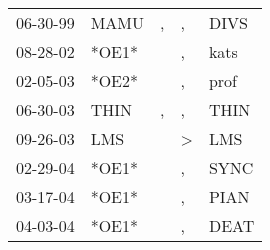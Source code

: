 \begin{supertabular}{p{0.07\textwidth}p{0.06\textwidth}p{0.02\textwidth}p{0.02\textwidth}p{0.06\textwidth}}
 06-30-99\textsuperscript{} &  MAMU\textsuperscript{} &  , &             , &  DIVS\textsuperscript{} \\
 08-28-02\textsuperscript{} &                   *OE1* &    &             , &  kats\textsuperscript{} \\
 02-05-03\textsuperscript{} &                   *OE2* &    &             , &  prof\textsuperscript{} \\
 06-30-03\textsuperscript{} &  THIN\textsuperscript{} &  , &             , &  THIN\textsuperscript{} \\
 09-26-03\textsuperscript{} &   LMS\textsuperscript{} &    &  \textgreater &   LMS\textsuperscript{} \\
 02-29-04\textsuperscript{} &                   *OE1* &    &             , &  SYNC\textsuperscript{} \\
 03-17-04\textsuperscript{} &                   *OE1* &    &             , &  PIAN\textsuperscript{} \\
 04-03-04\textsuperscript{} &                   *OE1* &    &             , &  DEAT\textsuperscript{} \\
\end{supertabular}
